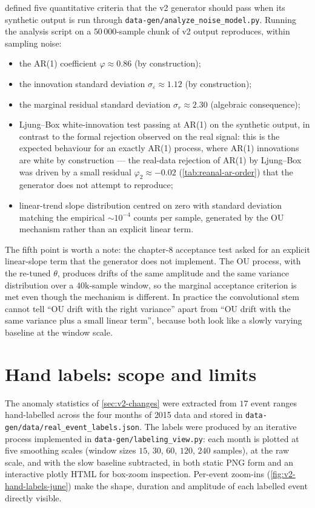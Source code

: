  defined five quantitative criteria that the
v2 generator should pass when its synthetic output is run through
\texttt{data-gen/analyze\_noise\_model.py}. Running the analysis
script on a $50\,000$-sample chunk of v2 output reproduces, within
sampling noise:

\begin{itemize}[leftmargin=*, itemsep=0.2em]
    \item the AR(1) coefficient $\varphi \approx 0.86$ (by
    construction);
    \item the innovation standard deviation
    $\sigma_\varepsilon \approx 1.12$ (by construction);
    \item the marginal residual standard deviation
    $\sigma_r \approx 2.30$ (algebraic consequence);
    \item Ljung--Box white-innovation test passing at AR(1) on the
    synthetic output, in contrast to the formal rejection observed
    on the real signal: this is the expected behaviour for an exactly
    AR(1) process, where AR(1) innovations are white by construction
    --- the real-data rejection of AR(1) by Ljung--Box was driven by
    a small residual $\varphi_2 \approx -0.02$
    (\cref{tab:reanal-ar-order}) that the generator does not attempt
    to reproduce;
    \item linear-trend slope distribution centred on zero with
    standard deviation matching the empirical $\sim 10^{-4}$ counts
    per sample, generated by the OU mechanism rather than an explicit
    linear term.
\end{itemize}

The fifth point is worth a note: the chapter-8 acceptance test asked
for an explicit linear-slope term that the generator does not
implement. The OU process, with the re-tuned $\theta$, produces drifts
of the same amplitude and the same variance distribution over a $40\text{k}$-sample
window, so the marginal acceptance criterion is met even though the
mechanism is different. In practice the convolutional stem cannot tell
``OU drift with the right variance'' apart from ``OU drift with the
same variance plus a small linear term'', because both look like a
slowly varying baseline at the window scale.

\section{Hand labels: scope and limits}
\label{sec:v2-labels}

The anomaly statistics of \cref{sec:v2-changes} were extracted from
$17$ event ranges hand-labelled across the four months of 2015 data
and stored in \texttt{data-gen/data/real\_event\_labels.json}. The
labels were produced by an iterative process implemented in
\texttt{data-gen/labeling\_view.py}: each month is plotted at five
smoothing scales (window sizes $15$, $30$, $60$, $120$, $240$
samples), at the raw scale, and with the slow baseline subtracted, in
both static PNG form and an interactive plotly HTML for box-zoom
inspection. Per-event zoom-ins (\cref{fig:v2-hand-labels-june}) make
the shape, duration and amplitude of each labelled event directly
visible.

